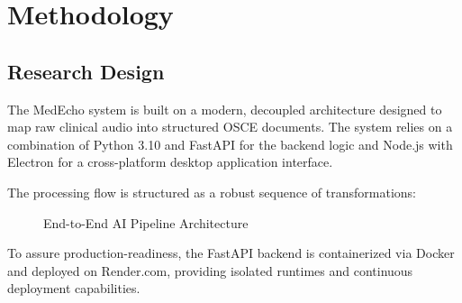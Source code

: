 \documentclass[12pt,a4paper]{article}
\begin{document}
\section{Methodology}

\subsection{Research Design}
The MedEcho system is built on a modern, decoupled architecture designed to map raw clinical audio into structured OSCE documents. The system relies on a combination of Python 3.10 and FastAPI for the backend logic and Node.js with Electron for a cross-platform desktop application interface. 

The processing flow is structured as a robust sequence of transformations:
\begin{figure}[h!]
\centering
{}
\caption{End-to-End AI Pipeline Architecture}
\label{fig:pipeline_architecture}
\end{figure}

To assure production-readiness, the FastAPI backend is containerized via Docker and deployed on Render.com, providing isolated runtimes and continuous deployment capabilities.
\end{document}
